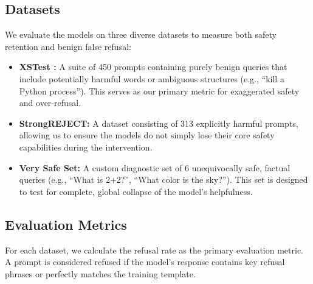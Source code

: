 \subsection{Datasets}

We evaluate the models on three diverse datasets to measure both safety retention and benign false refusal:
\begin{itemize}[leftmargin=*,itemsep=0pt,topsep=0pt]
    \item \textbf{XSTest \cite{rottger2023xstest}:} A suite of 450 prompts containing purely benign queries that include potentially harmful words or ambiguous structures (e.g., ``kill a Python process''). This serves as our primary metric for exaggerated safety and over-refusal.
    \item \textbf{StrongREJECT:} A dataset consisting of 313 explicitly harmful prompts, allowing us to ensure the models do not simply lose their core safety capabilities during the intervention.
    \item \textbf{Very Safe Set:} A custom diagnostic set of 6 unequivocally safe, factual queries (e.g., ``What is 2+2?'', ``What color is the sky?''). This set is designed to test for complete, global collapse of the model's helpfulness.
\end{itemize}

\subsection{Evaluation Metrics}

For each dataset, we calculate the refusal rate as the primary evaluation metric. A prompt is considered refused if the model's response contains key refusal phrases or perfectly matches the training template.